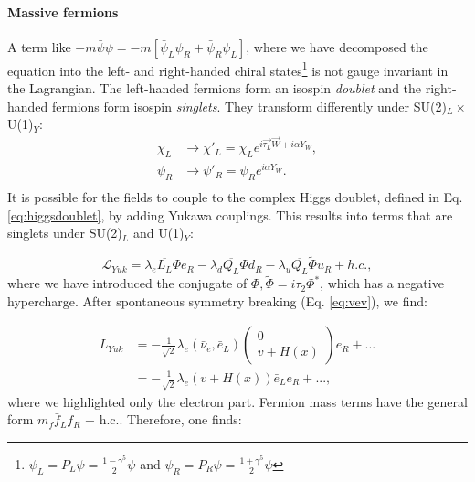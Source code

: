 \paragraph{Massive fermions}
A term like $-m\bar{\psi}\psi = -m\left[\bar{\psi}_L\psi_R + \bar{\psi}_R\psi_L\right]$, where we have decomposed the equation into the left- and right-handed chiral states\footnote{$\psi_L = P_L \psi = \frac{1-\gamma^5}{2} \psi$ and $\psi_R = P_R \psi = \frac{1+\gamma^5}{2} \psi$} is not gauge invariant in the Lagrangian. The left-handed fermions form an isospin \textit{doublet} and the right-handed fermions form isospin \textit{singlets}. They transform differently under SU(2)$_L \times$ U(1)$_Y$:
\begin{equation}
\begin{split}
\chi_L &\rightarrow \chi'_L = \chi_L e^{i \vec{\tau_L} \vec{W}+i\alpha Y_W},\\
\psi_R &\rightarrow \psi'_R = \psi_R e^{i\alpha Y_W}.\\
\end{split}
\end{equation} 
It is possible for the fields to couple to the complex Higgs doublet, defined in Eq. \ref{eq:higgsdoublet}, by adding Yukawa couplings. This results into terms that are singlets under SU(2)$_L$ and U(1)$_Y$:

\begin{equation}
\label{eq:yukawa}
\mathcal{L}_{Yuk} = \lambda_e \overline{L_L}\Phi e_R - \lambda_d \overline{Q_L} \Phi d_R - \lambda_u \overline{Q_L} \tilde{\Phi}u_R + h.c.,
\end{equation}
where we have introduced the conjugate of $\Phi,\tilde{\Phi} = i\tau_2 \Phi^*$, which has a negative hypercharge. After spontaneous symmetry breaking (Eq. \ref{eq:vev}), we find:

\begin{equation}
\begin{split}
L_{Yuk} &= -\frac{1}{\sqrt{2}} \lambda_e \left(\bar{\nu}_e, \bar{e}_L\right) \begin{pmatrix} 0 \\ v+H(x) \end{pmatrix} e_R + ... \\
\ &= -\frac{1}{\sqrt{2}} \lambda_e \left(v+H(x)\right)\bar{e}_L e_R + ...,
\end{split}
\end{equation}
where we highlighted only the electron part. Fermion mass terms have the general form $m_f \bar{f}_L f_R$ + h.c.. Therefore, one finds:

